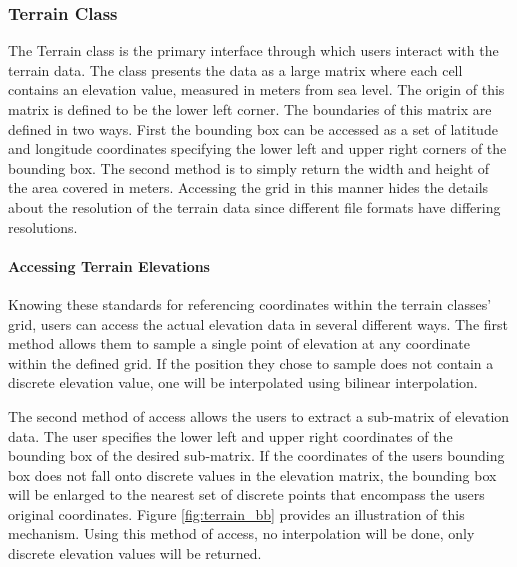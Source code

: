 \subsubsection{Terrain Class}
The Terrain class is the primary interface through which users interact with the terrain data.  The class presents the data as a large matrix where each cell contains an elevation value, measured in meters from sea level.  The origin of this matrix is defined to be the lower left corner.  The boundaries of this matrix are defined in two ways.  First the bounding box can be accessed as a set of latitude and longitude coordinates specifying the lower left and upper right corners of the bounding box.  The second method is to simply return the width and height of the area covered in meters.  Accessing the grid in this manner hides the details about the resolution of the terrain data since different file formats have differing resolutions.

\paragraph{Accessing Terrain Elevations}
Knowing these standards for referencing coordinates within the terrain classes' grid, users can access the actual elevation data in several different ways.  The first method allows them to sample a single point of elevation at any coordinate within the defined grid.  If the position they chose to sample does not contain a discrete elevation value, one will be interpolated using bilinear interpolation.

The second method of access allows the users to extract a sub-matrix of elevation data.  The user specifies the lower left and upper right coordinates of the bounding box of the desired sub-matrix.  If the coordinates of the users bounding box does not fall onto discrete values in the elevation matrix, the bounding box will be enlarged to the nearest set of discrete points that encompass the users original coordinates.  Figure \ref{fig:terrain_bb} provides an illustration of this mechanism.  Using this method of access, no interpolation will be done, only discrete elevation values will be returned.

